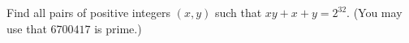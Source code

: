 Find all pairs of positive integers $(x,y)$ such that $xy+x+y=2^{32}$. (You may use that $6700417$ is prime.)

